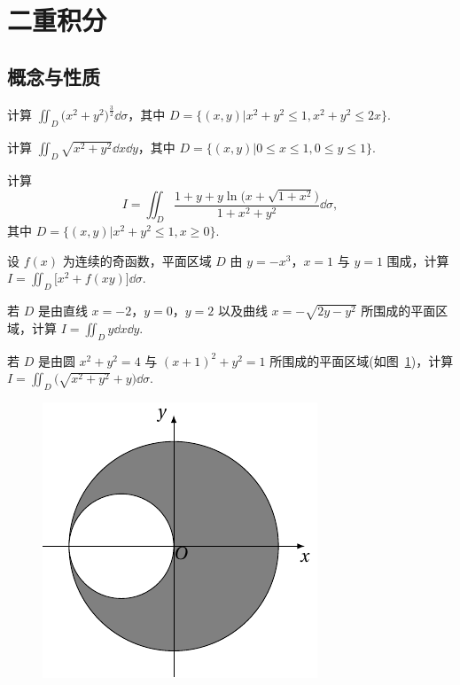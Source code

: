 \section{二重积分}
	\subsection{概念与性质}

	\begin{ti}
		计算 $\iint_{D} \bigl( x^{2} + y^{2} \bigr)^{\frac{3}{2}} \dd{\sigma}$，其中 $D = \bigl\{ (x,y) \bigl| x^{2} + y^{2} \leq 1, x^{2} + y^{2} \leq 2x \bigr\}$.
	\end{ti}

	\begin{ti}
		计算 $\iint_{D} \sqrt{x^{2} + y^{2}} \dd{x} \dd{y}$，其中 $D = \bigl\{ (x,y) \bigl| 0 \leq x \leq 1, 0 \leq y \leq 1 \bigr\}$.
	\end{ti}

	\begin{ti}
		计算
		\[
			I = \iint_{D} \frac{1 + y + y \ln \bigl( x + \sqrt{1 + x^{2}} \bigr)}{1 + x^{2} + y^{2}} \dd{\sigma},
		\]
		其中 $D = \bigl\{ (x,y) \bigl| x^{2} + y^{2} \leq 1, x \geq 0 \bigr\}$.
	\end{ti}

	\begin{ti}
		设 $f(x)$ 为连续的奇函数，平面区域 $D$ 由 $y = -x^{3}$，$x = 1$ 与 $y = 1$ 围成，计算 $I = \iint_{D} \bigl[ x^{2} + f(xy) \bigr] \dd{\sigma}$.
	\end{ti}

	\begin{ti}
		若 $D$ 是由直线 $x = -2$，$y = 0$，$y = 2$ 以及曲线 $x = -\sqrt{2y - y^{2}}$ 所围成的平面区域，计算 $I = \iint_{D} y \dd{x} \dd{y}$.
	\end{ti}

	\begin{ti}
		若 $D$ 是由圆 $x^{2} + y^{2} = 4$ 与 $(x + 1)^{2} + y^{2} = 1$ 所围成的平面区域(如图~\ref{fig:1.5.1})，计算 $I = \iint_{D} \bigl( \sqrt{x^{2} + y^{2}} + y \bigr) \dd{\sigma}$.
		\begin{figure}[htbp]
			\centering
			\includegraphics[scale=1]{figure/fig1-5-1.pdf}
			\caption{}\label{fig:1.5.1}
		\end{figure}
	\end{ti}

